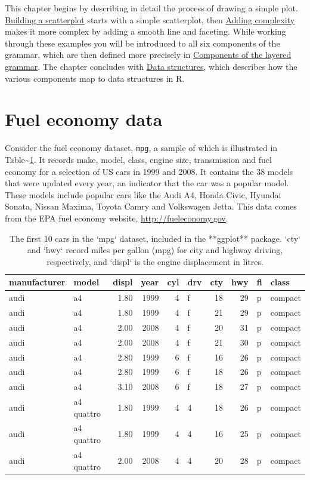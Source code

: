 This chapter begins by describing in detail the process of drawing a
simple plot. \hyperref[sec:simple-plot]{Building a scatterplot} starts
with a simple scatterplot, then \hyperref[sec:complex-plot]{Adding
complexity} makes it more complex by adding a smooth line and faceting.
While working through these examples you will be introduced to all six
components of the grammar, which are then defined more precisely in
\hyperref[sec:components]{Components of the layered grammar}. The
chapter concludes with \hyperref[sec:data-structures]{Data structures},
which describes how the various components map to data structures in R.

\section{Fuel economy data}\label{sec:fuel-economy-data}

Consider the fuel economy dataset, \texttt{mpg}, a sample of which is
illustrated in Table\textasciitilde{}\ref{tbl:mpg}. It records make,
model, class, engine size, transmission and fuel economy for a selection
of US cars in 1999 and 2008. It contains the 38 models that were updated
every year, an indicator that the car was a popular model. These models
include popular cars like the Audi A4, Honda Civic, Hyundai Sonata,
Nissan Maxima, Toyota Camry and Volkswagen Jetta. This data comes from
the EPA fuel economy website, \url{http://fueleconomy.gov}.

\begin{table}[ht]
\centering
\begin{tabular}{llrrrlrrll}
  \hline
manufacturer & model & displ & year & cyl & drv & cty & hwy & fl & class \\ 
  \hline
audi & a4 & 1.80 & 1999 &   4 & f &  18 &  29 & p & compact \\ 
  audi & a4 & 1.80 & 1999 &   4 & f &  21 &  29 & p & compact \\ 
  audi & a4 & 2.00 & 2008 &   4 & f &  20 &  31 & p & compact \\ 
  audi & a4 & 2.00 & 2008 &   4 & f &  21 &  30 & p & compact \\ 
  audi & a4 & 2.80 & 1999 &   6 & f &  16 &  26 & p & compact \\ 
  audi & a4 & 2.80 & 1999 &   6 & f &  18 &  26 & p & compact \\ 
  audi & a4 & 3.10 & 2008 &   6 & f &  18 &  27 & p & compact \\ 
  audi & a4 quattro & 1.80 & 1999 &   4 & 4 &  18 &  26 & p & compact \\ 
  audi & a4 quattro & 1.80 & 1999 &   4 & 4 &  16 &  25 & p & compact \\ 
  audi & a4 quattro & 2.00 & 2008 &   4 & 4 &  20 &  28 & p & compact \\ 
   \hline
\end{tabular}
\caption{The first 10 cars in the `mpg` dataset, included in the **ggplot** package.  `cty` and `hwy` record miles per gallon (mpg) for city and highway driving, respectively, and `displ` is the engine displacement in litres.} 
\label{tbl:mpg}
\end{table}

